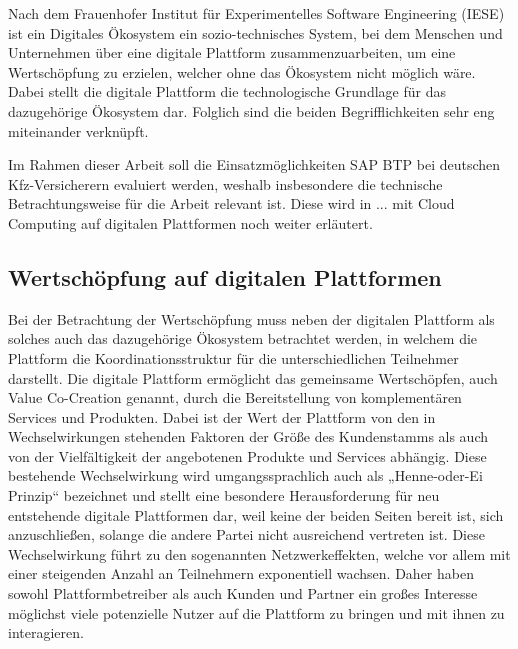 Nach dem Frauenhofer Institut für Experimentelles Software Engineering (IESE) ist ein Digitales Ökosystem ein sozio-technisches System, bei dem Menschen und Unternehmen über eine digitale Plattform zusammenzuarbeiten, um eine Wertschöpfung zu erzielen, welcher ohne das Ökosystem nicht möglich wäre. \autocite[Vgl.][S. 376]{MULLERSTEWENS2019} Dabei stellt die digitale Plattform die technologische Grundlage für das dazugehörige Ökosystem dar. \autocite[Vgl.][S. 376]{IESE2021} Folglich sind die beiden Begrifflichkeiten sehr eng miteinander verknüpft.

Im Rahmen dieser Arbeit soll die Einsatzmöglichkeiten SAP BTP bei deutschen Kfz-Versicherern evaluiert werden, weshalb insbesondere die technische Betrachtungsweise für die Arbeit relevant ist. Diese wird in ... mit Cloud Computing auf digitalen Plattformen noch weiter erläutert.


\subsection{Wertschöpfung auf digitalen Plattformen}

Bei der Betrachtung der Wertschöpfung muss neben der digitalen Plattform als solches auch das dazugehörige Ökosystem betrachtet werden, in welchem die Plattform die Koordinationsstruktur für die unterschiedlichen Teilnehmer darstellt. Die digitale Plattform ermöglicht das gemeinsame Wertschöpfen, auch Value Co-Creation genannt, durch die Bereitstellung von komplementären Services und Produkten. Dabei ist der Wert der Plattform von den in Wechselwirkungen stehenden Faktoren der Größe des Kundenstamms als auch von der Vielfältigkeit der angebotenen Produkte und Services abhängig. Diese bestehende Wechselwirkung wird umgangssprachlich auch als „Henne-oder-Ei Prinzip“ bezeichnet und stellt eine besondere Herausforderung für neu entstehende digitale Plattformen dar, weil keine der beiden Seiten bereit ist, sich anzuschließen, solange die andere Partei nicht ausreichend vertreten ist. \autocite[Vgl.][S. 310]{CAILLAUD2003} Diese Wechselwirkung führt zu den sogenannten Netzwerkeffekten, welche vor allem mit einer steigenden Anzahl an Teilnehmern exponentiell wachsen. Daher haben sowohl Plattformbetreiber als auch Kunden und Partner ein großes Interesse möglichst viele potenzielle Nutzer auf die Plattform zu bringen und mit ihnen zu interagieren. \autocite[Vgl.][S. 596-600]{HAHN2016} 

